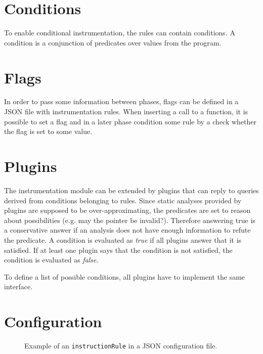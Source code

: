 \section{Conditions}\label{sec:conditions}

To enable conditional instrumentation, the rules can contain conditions. A
condition is a conjunction of predicates over values from the program.

\section{Flags}
In order to pass some information between phases, flags can be defined in a
JSON file with instrumentation rules. When inserting a call to a function, it
is possible to set a flag and in a later phase condition some rule by a check
whether the flag is set to some value.

\section{Plugins}

The instrumentation module can be extended by plugins that can reply to queries
derived from conditions belonging to rules. Since static analyses provided by
plugins are supposed to be over-approximating, the predicates are set to reason
about possibilities (e.g. may the pointer be invalid?). Therefore answering
true is a conservative answer if an analysis does not have enough information
to refute the predicate. A condition is evaluated as \emph{true} if all plugins
answer that it is satisfied. If at least one plugin says that the condition is
not satisfied, the condition is evaluated as \emph{false}.

To define a list of possible conditions, all plugins have to implement the same
interface.

\section{Configuration}


\begin{figure}[h]

\caption{Example of an \texttt{instructionRule} in a JSON configuration file.}
\label{fig:json_example}
\end{figure}

